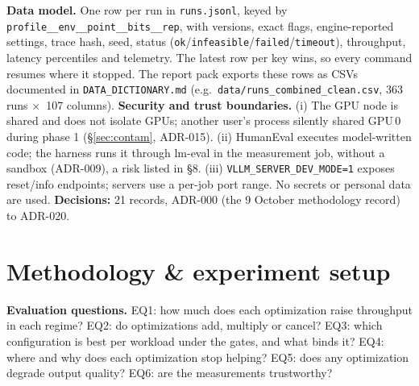 \documentclass[10pt,a4paper]{article}
\newcommand{\x}{\ensuremath{\times}}
\newcommand{\fp}[1]{{\leavevmode\urlstyle{tt}\color{codecol}\nolinkurl{#1}}}
\begin{document}
\textbf{Data model.} One row per run in \fp{runs.jsonl}, keyed by \texttt{profile\_\_env\_\_point\_\_bits\_\_rep},
with versions, exact flags, engine-reported settings, trace hash, seed, status
(\texttt{ok}/\texttt{infeasible}/\texttt{failed}/\texttt{timeout}), throughput, latency percentiles and telemetry.
The latest row per key wins, so every command resumes where it stopped. The report pack exports these rows as CSVs
documented in \fp{DATA_DICTIONARY.md} (e.g.\ \fp{data/runs_combined_clean.csv}, 363 runs \x\ 107 columns).
\textbf{Security and trust boundaries.} (i) The GPU node is shared and does not isolate GPUs; another user's process
silently shared GPU\,0 during phase 1 (\S\ref{sec:contam}, ADR-015). (ii) HumanEval executes model-written code; the harness runs it
through lm-eval in the measurement job, without a sandbox (ADR-009), a risk listed in \S8.
(iii) \texttt{VLLM\_SERVER\_DEV\_MODE=1} exposes reset/info endpoints; servers use a per-job port range. No secrets or
personal data are used. \textbf{Decisions:} 21 records, ADR-000 (the 9 October methodology record) to ADR-020.

\section{Methodology \& experiment setup}
\textbf{Evaluation questions.} EQ1: how much does each optimization raise throughput in each regime? EQ2: do
optimizations add, multiply or cancel? EQ3: which configuration is best per workload under the gates, and what
binds it? EQ4: where and why does each optimization stop helping? EQ5: does any optimization degrade output quality?
EQ6: are the measurements trustworthy?
\end{document}
